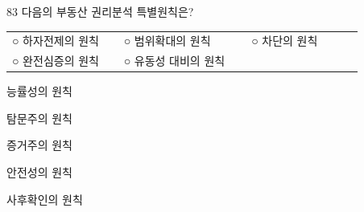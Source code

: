 \begin{question}{83}
다음의 부동산 권리분석 특별원칙은?
\begin{framedtext}
\begin{tabular}{@{}p{0.28\linewidth}p{0.32\linewidth}p{0.28\linewidth}@{}}
○ 하자전제의 원칙 & ○ 범위확대의 원칙 & ○ 차단의 원칙 \\
○ 완전심증의 원칙 & ○ 유동성 대비의 원칙 &
\end{tabular}
\end{framedtext}
\begin{choices}
  \item 능률성의 원칙
  \item 탐문주의 원칙
  \item 증거주의 원칙
  \item 안전성의 원칙
  \item 사후확인의 원칙
\end{choices}
\end{question}
